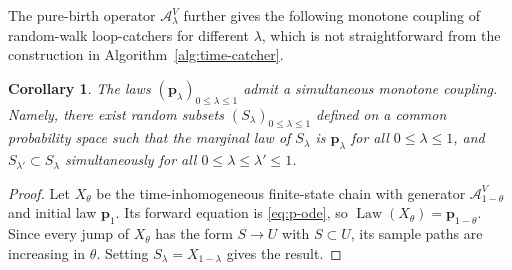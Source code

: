 \documentclass[11pt]{article}
\numberwithin{equation}{section}
\newcommand{\1}{\mathbf{1}}
\newtheorem{corollary}[theorem]{Corollary}
\newcommand{\Ac}{\mathcal A}
\newcommand{\bp}{\mathbf p}
\begin{document}
The pure-birth operator $\Ac_\lambda^V$ further gives the following monotone coupling of random-walk loop-catchers for different $\lambda$, which is not straightforward from the construction in Algorithm~\ref{alg:time-catcher}. 
\begin{corollary}\label{cor:finite-monotone-coupling}
The laws \((\bp_\lambda)_{0\le\lambda\le1}\) admit a simultaneous
monotone coupling. Namely, there exist random subsets
\((S_\lambda)_{0\le\lambda\le1}\) defined on a common probability space
such that the marginal law of $S_\lambda$ is $\bp_\lambda$ for all $0\le\lambda\le 1$, and $S_{\lambda'}\subset S_\lambda$ simultaneously for all
\(0\le\lambda\le\lambda'\le1\).
\end{corollary}

\begin{proof}
Let \(X_\theta\) be the time-inhomogeneous finite-state chain
with generator \(\Ac_{1-\theta}^V\) and initial law \(\bp_1\).  Its forward
equation is \eqref{eq:p-ode}, so
\(\operatorname{Law}(X_\theta)=\bp_{1-\theta}\). Since every jump of \(X_\theta\) has
the form \(S\to U\) with \(S\subset U\), its sample paths are increasing in
\(\theta\). Setting \(S_\lambda=X_{1-\lambda}\) gives the result.
\end{proof}
\end{document}
